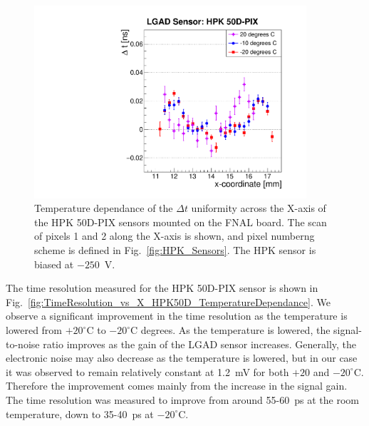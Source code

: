 \documentclass[preprint,1p]{elsarticle}
\begin{document}
\begin{figure}[htbp] 
\centering
\includegraphics[width=0.9\textwidth]{figs/FNAL_MeanTime_vs_X_HPK50D_TemperatureDependance.pdf} 
\caption{Temperature dependance of the $\Delta t$ uniformity across
the X-axis of the HPK 50D-PIX sensors mounted on the FNAL board. The scan of
pixels 1 and 2 along the X-axis is shown, and pixel numberng scheme is defined
in Fig.~\ref{fig:HPK_Sensors}. The HPK sensor is biased at $-250$~V.} 
\label{fig:MeanTime_vs_X_HPK50D_TemperatureDependance} 
\end{figure} 

The time resolution measured for the HPK 50D-PIX sensor is
shown in Fig.~\ref{fig:TimeResolution_vs_X_HPK50D_TemperatureDependance}. 
We observe a significant improvement in the time resolution as
the temperature is lowered from $+20^{\circ}$C to $-20^{\circ}$C degrees.
As the temperature is lowered, the signal-to-noise ratio improves as 
the gain of the LGAD sensor increases. Generally, the electronic noise may also
decrease as the temperature is lowered, but in our case it was observed to remain 
relatively constant at 1.2~mV for both $+20$ and 
$-20^{\circ}$C. Therefore the improvement comes mainly from the increase in the 
signal gain. The time resolution was measured to
improve from around 55-60~ps at the room temperature, down to 35-40~ps at
$-20^{\circ}$C.
\end{document}
